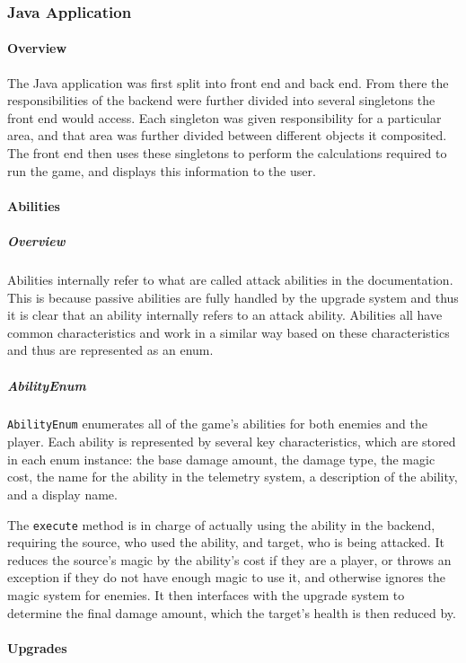 \subsubsection{Java Application}

\paragraph{Overview}
The Java application was first split into front end and back end. From there the responsibilities of the backend were further divided into several singletons the front end would access. Each singleton was given responsibility for a particular area, and that area was further divided between different objects it composited. The front end then uses these singletons to perform the calculations required to run the game, and displays this information to the user.

\paragraph{Abilities}

\subparagraph{Overview}
Abilities internally refer to what are called attack abilities in the documentation. This is because passive abilities are fully handled by the upgrade system and thus it is clear that an ability internally refers to an attack ability. Abilities all have common characteristics and work in a similar way based on these characteristics and thus are represented as an enum.

\subparagraph{AbilityEnum}
\texttt{AbilityEnum} enumerates all of the game's abilities for both enemies and the player. Each ability is represented by several key characteristics, which are stored in each enum instance: the base damage amount, the damage type, the magic cost, the name for the ability in the telemetry system, a description of the ability, and a display name.

The \texttt{execute} method is in charge of actually using the ability in the backend, requiring the source, who used the ability, and target, who is being attacked. It reduces the source's magic by the ability's cost if they are a player, or throws an exception if they do not have enough magic to use it, and otherwise ignores the magic system for enemies. It then interfaces with the upgrade system to determine the final damage amount, which the target's health is then reduced by.

\paragraph{Upgrades}

